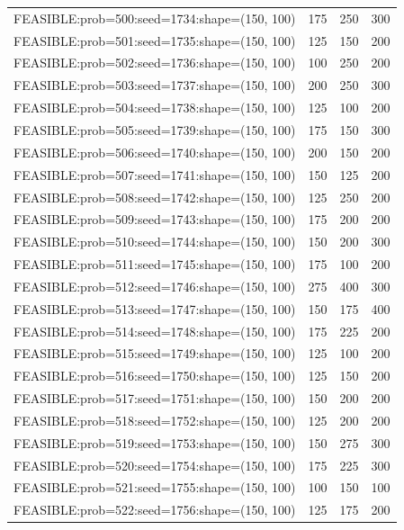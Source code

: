 \begin{longtable}{lccc}
FEASIBLE:prob=500:seed=1734:shape=(150, 100) &      175 &   250 &    300 \\
FEASIBLE:prob=501:seed=1735:shape=(150, 100) &      125 &   150 &    200 \\
FEASIBLE:prob=502:seed=1736:shape=(150, 100) &      100 &   250 &    200 \\
FEASIBLE:prob=503:seed=1737:shape=(150, 100) &      200 &   250 &    300 \\
FEASIBLE:prob=504:seed=1738:shape=(150, 100) &      125 &   100 &    200 \\
FEASIBLE:prob=505:seed=1739:shape=(150, 100) &      175 &   150 &    300 \\
FEASIBLE:prob=506:seed=1740:shape=(150, 100) &      200 &   150 &    200 \\
FEASIBLE:prob=507:seed=1741:shape=(150, 100) &      150 &   125 &    200 \\
FEASIBLE:prob=508:seed=1742:shape=(150, 100) &      125 &   250 &    200 \\
FEASIBLE:prob=509:seed=1743:shape=(150, 100) &      175 &   200 &    200 \\
FEASIBLE:prob=510:seed=1744:shape=(150, 100) &      150 &   200 &    300 \\
FEASIBLE:prob=511:seed=1745:shape=(150, 100) &      175 &   100 &    200 \\
FEASIBLE:prob=512:seed=1746:shape=(150, 100) &      275 &   400 &    300 \\
FEASIBLE:prob=513:seed=1747:shape=(150, 100) &      150 &   175 &    400 \\
FEASIBLE:prob=514:seed=1748:shape=(150, 100) &      175 &   225 &    200 \\
FEASIBLE:prob=515:seed=1749:shape=(150, 100) &      125 &   100 &    200 \\
FEASIBLE:prob=516:seed=1750:shape=(150, 100) &      125 &   150 &    200 \\
FEASIBLE:prob=517:seed=1751:shape=(150, 100) &      150 &   200 &    200 \\
FEASIBLE:prob=518:seed=1752:shape=(150, 100) &      125 &   200 &    200 \\
FEASIBLE:prob=519:seed=1753:shape=(150, 100) &      150 &   275 &    300 \\
FEASIBLE:prob=520:seed=1754:shape=(150, 100) &      175 &   225 &    300 \\
FEASIBLE:prob=521:seed=1755:shape=(150, 100) &      100 &   150 &    100 \\
FEASIBLE:prob=522:seed=1756:shape=(150, 100) &      125 &   175 &    200 \\

\end{longtable}
